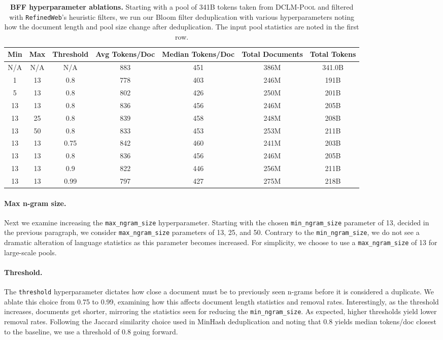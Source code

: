 \documentclass{article}
\newcommand{\rawpool}{\textsc{DCLM-Pool}\xspace}
\newcommand{\rw}{\texttt{RefinedWeb}\xspace}
\begin{document}
\begin{table}[t]
\centering
\small
\caption{\textbf{BFF hyperparameter ablations.} Starting with a pool of 341B tokens taken from \rawpool and filtered with \rw's heuristic filters, we run our Bloom filter deduplication with various hyperparameters noting how the document length and pool size change after deduplication. The input pool statistics are noted in the first row.}
\label{table:dedup-ablations-v6}
\begin{tabular}{ccc|cccc}
\toprule

Min & Max & Threshold & Avg Tokens/Doc & Median Tokens/Doc & Total Documents & Total Tokens \\
\midrule
N/A & N/A & N/A &  883 & 451 &  386M & 341.0B \\
1 & 13 & 0.8 & 778 & 403 & 246M & 191B \\
5 & 13 & 0.8 & 802 & 426 & 250M & 201B \\
13 & 13 & 0.8 & 836 & 456 & 246M & 205B \\
13 & 25 & 0.8 & 839 & 458 & 248M & 208B \\
13 & 50 & 0.8 & 833 & 453 & 253M & 211B \\
\midrule
13 & 13 & 0.75 & 842 & 460 & 241M & 203B \\
13 & 13 & 0.8 & 836 & 456 & 246M & 205B \\
13 & 13 & 0.9 & 822 & 446 & 256M & 211B \\
13 & 13 & 0.99 & 797 & 427 & 275M & 218B\\
\bottomrule
\end{tabular}
\end{table}


\paragraph{Max n-gram size.}
Next we examine increasing the \texttt{max\_ngram\_size} hyperparameter. Starting with the chosen \texttt{min\_ngram\_size} parameter of 13, decided in the previous paragraph, we consider \texttt{max\_ngram\_size} parameters of 13, 25, and 50. Contrary to the \texttt{min\_ngram\_size}, we do not see a dramatic alteration of language statistics as this parameter becomes increased. For simplicity, we choose to use a \texttt{max\_ngram\_size} of 13 for large-scale pools.

\paragraph{Threshold.}
The \texttt{threshold} hyperparameter dictates how close a document must be to previously seen n-grams before it is considered a duplicate. We ablate this choice from 0.75 to 0.99, examining how this affects document length statistics and removal rates. Interestingly, as the threshold increases, documents get shorter, mirroring the statistics seen for reducing the \texttt{min\_ngram\_size}. As expected, higher thresholds yield lower removal rates. Following the Jaccard similarity choice used in MinHash deduplication and noting that 0.8 yields median tokens/doc closest to the baseline, we use a threshold of 0.8 going forward.
\end{document}
